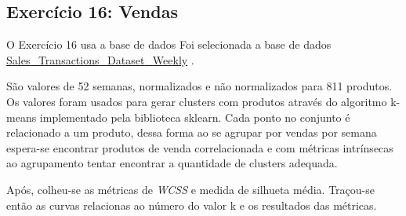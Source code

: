 \subsection{Exercício 16: Vendas}

O Exercício 16 usa a base de dados Foi selecionada a base de dados  \href{https://archive.ics.uci.edu/ml/datasets/Sales_Transactions_Dataset_Weekly}{Sales{\_}Transactions{\_}Dataset{\_}Weekly} \citep{dataset_tan_uci_2017}.

São valores de 52 semanas, normalizados e não normalizados para 811 produtos. Os valores  foram usados para gerar clusters com produtos através do algoritmo k-means implementado pela biblioteca sklearn. Cada ponto no conjunto é relacionado a um produto, dessa forma ao se agrupar por vendas por semana espera-se encontrar produtos de venda correlacionada e com métricas intrínsecas ao agrupamento tentar encontrar a quantidade de clusters adequada.

Após, colheu-se as métricas de \textit{WCSS} e medida de silhueta média. Traçou-se então as curvas relacionas ao número do valor k e os resultados das métricas.